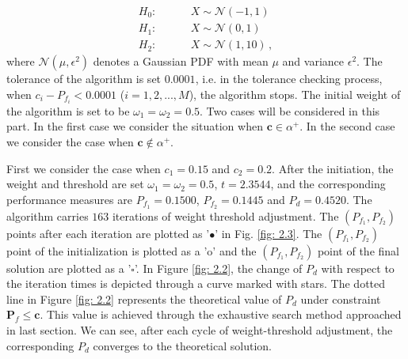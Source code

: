 \begin{equation}
\label{equ: Gaussian Hypothesis}
\begin{split}
	H_0:\;\;\;\;\;\;\;\;&X \sim \mathcal{N}(-1,1)\\
    H_1:\;\;\;\;\;\;\;\;&X \sim \mathcal{N}(0,1)\\
    H_2:\;\;\;\;\;\;\;\;&X \sim \mathcal{N}(1,10)\,,
\end{split}
\end{equation}
where $\mathcal{N}(\mu, \epsilon^2)$ denotes a Gaussian PDF with mean $\mu$ and variance $\epsilon^2$.
The tolerance of the algorithm is set $0.0001$, i.e. in the tolerance checking process, when $c_i - P_{f_i} < 0.0001$ ($i = 1, 2, ..., M$), the algorithm stops. The initial weight of the algorithm is set to be $\omega_1 = \omega_2 = 0.5$. 
Two cases will be considered in this part. In the first case we consider the situation when $\mathbf{c} \in \alpha^+$. In the second case we consider the case when $\mathbf{c} \notin \alpha^+$.

First we consider the case when $c_1 = 0.15$ and $c_2 = 0.2$.
After the initiation, the weight and threshold are set $\omega_1 = \omega_2 = 0.5$, $t =2.3544$, and the corresponding performance measures are $P_{f_1}  = 0.1500$, $P_{f_2} = 0.1445$ and $P_d = 0.4520$. The algorithm carries $163$ iterations of weight threshold adjustment. The $(P_{f_1}, P_{f_2})$  points after each iteration are plotted as '$\bullet$' in Fig. \ref{fig: 2.3}. 
The $(P_{f_1}, P_{f_2})$ point of the initialization is plotted as  a 'o' and the $(P_{f_1}, P_{f_2})$ point of the final solution are plotted as a '$\square$'. 
In Figure \ref{fig: 2.2}, the change of $P_d$ with respect to the iteration times is depicted through a curve marked with stars.   
The dotted line in Figure \ref{fig: 2.2} represents the theoretical value of $P_d$ under constraint $\mathbf{P}_f \leq \mathbf{c}$. This value is achieved through the exhaustive search method approached in last section. We can see, after each cycle of weight-threshold adjustment, the corresponding $P_d$ converges to the theoretical solution. 


